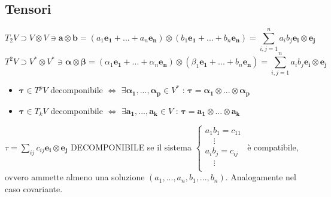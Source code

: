 \documentclass[10pt]{article}
\theoremstyle{plain}
\begin{document}
\subsection*{Tensori}
\[ T_2V \supset V \otimes V \owns \mathbf{a} \otimes \mathbf{b} = (a_1 \mathbf{e_1} + ... + a_n \mathbf{e_n}) \otimes (b_1 \mathbf{e_1} + ... + b_n \mathbf{e_n}) = \sum \limits_{i, j = 1}^{n} a_i b_j \mathbf{e_i} \otimes \mathbf{e_j}\]
\[ T^2V \supset V^* \otimes V^* \owns \mathbf{\alpha} \otimes \mathbf{\beta} = (\alpha_1 \mathbf{e_1} + ... + \alpha_n \mathbf{e_n}) \otimes (\beta_1 \mathbf{e_1} + ... + b_n \mathbf{e_n}) = \sum \limits_{i, j = 1}^{n} a_i b_j \mathbf{e_i} \otimes \mathbf{e_j}\]
\begin{itemize}[label=$\bullet$]
\item $\mathbf{\tau} \in T^pV$ decomponibile $\Longleftrightarrow$ $\exists \mathbf{\alpha_1}, ... , \mathbf{\alpha_p} \in V^*$ : $\mathbf{\tau} = \mathbf{\alpha_1} \otimes ... \otimes \mathbf{\alpha_p}$
\item $\mathbf{\tau} \in T_kV$ decomponibile $\Longleftrightarrow$ $\exists \mathbf{a_1}, ... , \mathbf{a_k} \in V$ : $\mathbf{\tau} = \mathbf{a_1} \otimes ... \otimes \mathbf{a_k}$
\end{itemize}
$\tau = \sum_{ij} c_{ij} \mathbf{e_i} \otimes \mathbf{e_j}$ DECOMPONIBILE se il sistema $\begin{cases}
    a_1 b_1 = c_{11}\\
    \quad \vdots\\
    a_i b_j = c_{ij}\\
    \quad \vdots\\
\end{cases}$ è compatibile, ovvero ammette almeno una soluzione $(a_1, ..., a_n, b_1, ..., b_n)$. Analogamente nel caso covariante.
\end{document}
